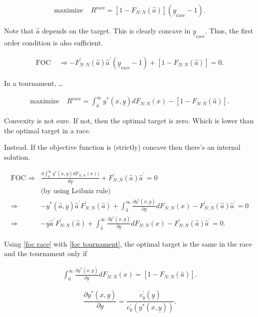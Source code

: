 \documentclass[11pt, titlepage]{article}
\newcommand\target{\underline{y}}
\newcommand\race{\text{race}}
\newcommand\mtype{\hat{a}}
\newcommand\dystar{\frac{\partial y^*(x,\target)}{\partial\target}dF_{N:N}(x)}
\begin{document}
\begin{align}
  \text{maximize } & R^\race = [1-F_{N:N}(\mtype)] (\target_\race - 1).
\end{align}

Note that \(\mtype\) depends on the target. This is clearly concave in
\(\target_\race\). Thus, the first order condition is also sufficient.

\begin{align}\label{foc race}
  \text{FOC } & \Rightarrow -F^\prime_{N:N}(\mtype) \mtype^\prime (\target_\race - 1) + [1-F_{N:N}(\mtype)] = 0.
\end{align}

In a tournament, \ldots{}

\begin{align}
  \text{maximize } & R^\race = \int_{\mtype}^\infty y^*(x, \target) d F_{N:N}(x) - [1-F_{N:N}(\mtype)]. 
\end{align}

Convexity is not sure. If not, then the optimal target is zero. Which is
lower than the optimal target in a race.

Instead. If the objective function is (strictly) concave then there's an
internal solution.

\begin{align} \label{foc tournament}
  \text{FOC } \Rightarrow & 
    \frac{d\int_{\mtype}^\infty y^*(x, \target) d F_{N:N}(x)) }{d \target}
      + F^\prime_{N:N}(\mtype) \mtype^\prime =0 \nonumber\\ 
    & \text{(by using Leibniz rule)}\nonumber\\
  \Rightarrow & - y^*(\mtype, \target) \mtype^\prime F^\prime_{N:N}(\mtype) 
      + \int_{\mtype}^\infty \dystar - F^\prime_{N:N}(\mtype) \mtype^\prime = 0\nonumber\\
  \Rightarrow & -\target \mtype^\prime F^\prime_{N:N}(\mtype) 
      + \int_{\mtype}^\infty \dystar - F^\prime_{N:N}(\mtype) \mtype^\prime = 0.
\end{align}

Using \eqref{foc race} with \eqref{foc tournament}, the optimal target
is the same in the race and the tournament only if

\begin{align} 
  \int_{\mtype}^\infty \dystar = [1- F_{N:N}(\mtype)].
\end{align}

\[
  \frac{\partial y^*(x, \target)}{\partial \target} = 
    \frac{c_y^\prime(\target)}{c_y^\prime(y^*(x, \target))}. 
\]
\end{document}
